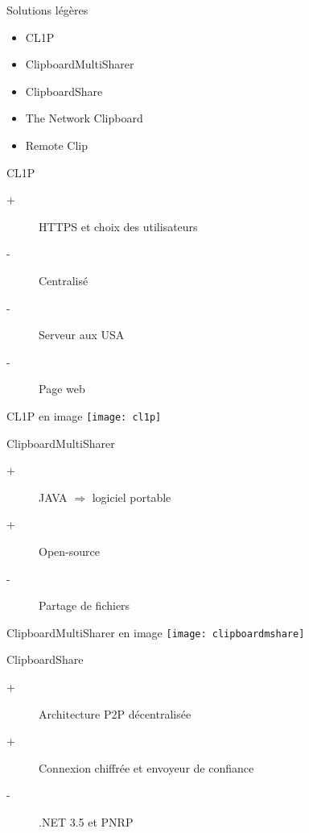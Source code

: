 \documentclass{beamer}
\begin{document}
\begin{frame}{Solutions légères}
  \begin{itemize}
  \item CL1P
  \item ClipboardMultiSharer
  \item ClipboardShare
  \item The Network Clipboard
  \item Remote Clip
  \end{itemize}
\end{frame}

\begin{frame}{CL1P}
    \begin{description}
    \item[+] HTTPS et choix des utilisateurs
    \item[-] Centralisé
    \item[-] Serveur aux USA
    \item[-] Page web
    \end{description}
  \begin{block}{CL1P en image}
    \center\texttt{[image: cl1p]}
  \end{block}
\end{frame}

\begin{frame}{ClipboardMultiSharer}
  \begin{description}
  \item[+] JAVA $\Rightarrow$ logiciel portable
  \item[+] Open-source
  \item[-] Partage de fichiers
  \end{description}
  \begin{block}{ClipboardMultiSharer en image}
    \center\texttt{[image: clipboardmshare]}
  \end{block}
\end{frame}

\begin{frame}{ClipboardShare}
  \begin{description}
    \item[+] Architecture P2P décentralisée
    \item[+] Connexion chiffrée et envoyeur de confiance
    \item[-] .NET 3.5 et PNRP
  \end{description}
\end{frame}
\end{document}
